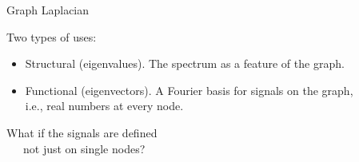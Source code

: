\documentclass[10pt,t, handout]{beamer} %
\begin{document}
\begin{frame}{Graph Laplacian}
	\vskip 10pt
	\pause

	Two types of uses:
	\begin{itemize}
		\item[] \textcolor{pblue}{Structural (eigenvalues).} The spectrum as a feature of the graph.

		\pause

		\item[] \textcolor{pblue}{Functional (eigenvectors).} A Fourier basis for signals on the graph, \\

		\vskip 5pt
		\hspace*{5cm} \pause i.e., real numbers at every node.
	\end{itemize}

	\pause

	What if the signals are defined \\
	\textcolor{pblue}{\ \ \ not just on single nodes?}
\end{frame}
\end{document}
